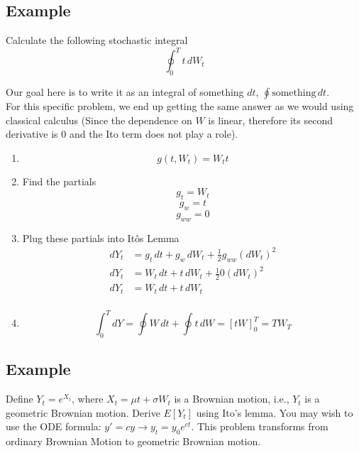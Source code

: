 \documentclass[11pt]{article}
\begin{document}
\subsection{Example}
Calculate the following stochastic integral
\[\oint_0^T t \, dW_t\] 

Our goal here is to write it as an integral of something $dt$, $\oint \text{something} \, dt$. 
\\
For this specific problem, we end up getting the same answer as we would using classical
calculus (Since the dependence on $W$ is linear, therefore its second derivative is 0 and the 
Ito term does not play a role). \\

\begin{enumerate}
    \item  \[ g(t, W_t) = W_t t\]
    \item Find the partials 
    \[g_t = W_t\]
    \[g_w = t\] %
    \[g_{ww} = 0\]
    \item Plug these partials into It\^{o}s Lemma
    \begin{align*}
        dY_t &= g_t \,dt + g_w \,dW_t + \frac{1}{2} g_{ww} {(dW_t)}^2 \\
        dY_t &= W_t \,dt + t \,dW_t + \frac{1}{2} 0 {(dW_t)}^2 \\
        dY_t &= W_t \,dt + t \,dW_t \\
    \end{align*}
    \item \[\int_{0}^{T}dY = \oint W \,dt + \oint t \, dW = {\left[tW\right]}_0^T = TW_T\] %
\end{enumerate}

\subsection{Example}
Define $Y_t = e^{X_t}$, where $X_t = \mu t + \sigma W_t$ is a Brownian motion, i.e., $Y_t$ is 
a geometric Brownian motion. Derive $E[Y_t]$ using Ito's lemma. You may wish to use the ODE 
formula: $y' = cy \rightarrow y_t = y_0 e^{ct}$. This problem transforms from ordinary
Brownian Motion to geometric Brownian motion. 
\end{document}
